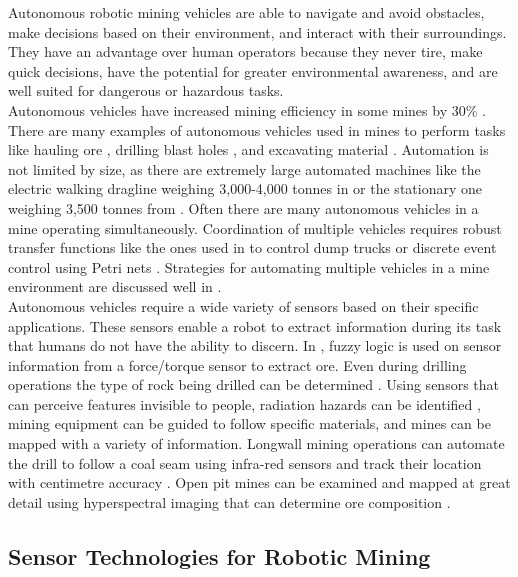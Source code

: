 Autonomous robotic mining vehicles are able to navigate and avoid obstacles, make decisions based on their environment, and interact with their surroundings. They have an advantage over human operators because they never tire, make quick decisions, have the potential for greater environmental awareness, and are well suited for dangerous or hazardous tasks.\\

Autonomous vehicles have increased mining efficiency in some mines by 30\% \cite{30p}. There are many examples of autonomous vehicles used in mines to perform tasks like hauling ore \cite{haul}, drilling blast holes \cite{blast}, and excavating material \cite{excavate}. Automation is not limited by size, as there are extremely large automated machines like the electric walking dragline weighing 3,000-4,000 tonnes in \cite{large} or the stationary one weighing 3,500 tonnes from \cite{3500}. Often there are many autonomous vehicles in a mine operating simultaneously. Coordination of multiple vehicles requires robust transfer functions like the ones used in \cite{dump} to control dump trucks or discrete event control using Petri nets \cite{petri}. Strategies for automating multiple vehicles in a mine environment are discussed well in \cite{multi}.\\

Autonomous vehicles require a wide variety of sensors based on their specific applications. These sensors enable a robot to extract information during its task that humans do not have the ability to discern. In \cite{fuzzy}, fuzzy logic is used on sensor information from a force/torque sensor to extract ore. Even during drilling operations the type of rock being drilled can be determined \cite{drill}. Using sensors that can perceive features invisible to people, radiation hazards can be identified \cite{radio}, mining equipment can be guided to follow specific materials, and mines can be mapped with a variety of information. Longwall mining operations can automate the drill to follow a coal seam using infra-red sensors \cite{seam} and track their location with centimetre accuracy \cite{real}. Open pit mines can be examined and mapped at great detail using hyperspectral imaging that can determine ore composition \cite{spectral}.\\

\subsection{Sensor Technologies for Robotic Mining}

